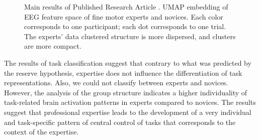 \begin{figure}[ht]
\begin{center}

\caption[Main results of Published Research Article ]{Main results of Published Research Article . UMAP embedding of EEG feature space of fine motor experts and novices. Each color corresponds to one participant; each dot corresponds to one trial. The experts' data clustered structure is more dispersed, and clusters are more compact.}
\label{fig:results4}
\end{center}
\end{figure}

\noindent The results of task classification suggest that contrary to what was predicted by the reserve hypothesis, expertise does not influence the differentiation of task representations. Also, we could not classify between experts and novices. However, the analysis of the group structure indicates a higher individuality of task-related brain activation patterns in experts compared to novices. The results suggest that professional expertise leads to the development of a very individual and task-specific pattern of central control of tasks that corresponds to the context of the expertise.

